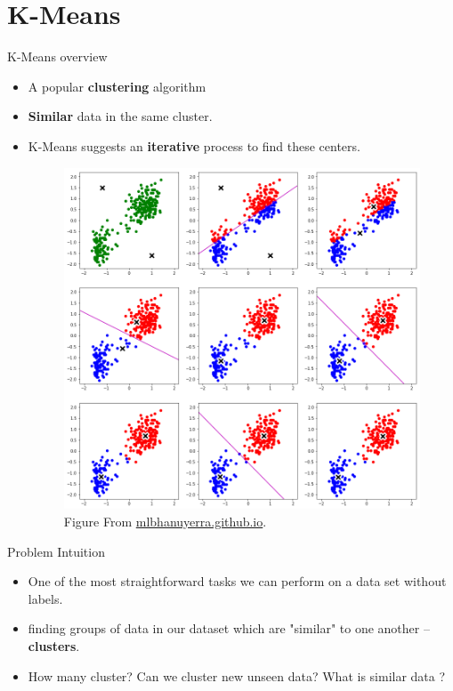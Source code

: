 \documentclass[serif, aspectratio=169]{beamer}
\begin{document}
\section{K-Means}
\begin{frame}{K-Means overview}
    \begin{itemize}
        \item   A popular \textbf{clustering} algorithm
        \item \textbf{Similar} data in the same cluster.
        \item K-Means suggests an \textbf{iterative} process to find these centers.
        \begin{figure}
        \centering
        \includegraphics[scale=0.18]{pic/figs/Clustering_K-means_7_1.png}
        Figure From \href{https://mlbhanuyerra.github.io/2018-02-19-Clustering-K-means/}{mlbhanuyerra.github.io}.
    \end{figure}
    \end{itemize}
\end{frame}

\begin{frame}{Problem Intuition}
    \begin{itemize}
    
        \item One of the most straightforward tasks we can perform on a data set without labels.
        \item finding groups of data in our dataset which are "similar" to one another --\textbf{clusters}.
        \item How many cluster? Can we cluster new unseen data? What is similar data ?
    \end{itemize}
\end{frame}
\end{document}
